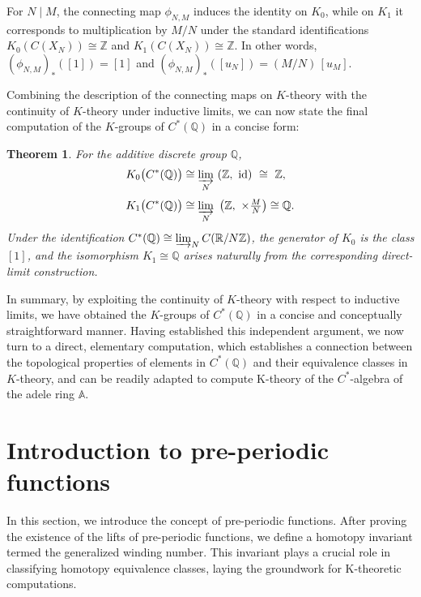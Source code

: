 \documentclass[11pt]{article}
\newtheorem{theorem}{Theorem}[section]  %
\newcommand{\Z}{\mathbb{Z}}
\newcommand{\Q}{\mathbb{Q}}
\newcommand{\R}{\mathbb{R}}
\newcommand{\A}{\mathbb{A}}
\newcommand{\cstar}{C^{*}}
\newcommand{\id}{\mathrm{id}}
\theoremstyle{remark}
\begin{document}
For $N \mid M$, the connecting map $\phi_{N,M}$ induces the identity on $K_0$, 
while on $K_1$ it corresponds to multiplication by $M/N$ under the standard 
identifications $K_0(C(X_N))\cong \Z$ and $K_1(C(X_N))\cong \Z$. 
In other words, $(\phi_{N,M})_*([1])=[1]$ and $(\phi_{N,M})_*([u_N])=(M/N)\,[u_M]$.

Combining the description of the connecting maps on $K$-theory with the continuity of $K$-theory under inductive limits, 
we can now state the final computation of the $K$-groups of $C^*(\mathbb{Q})$ in a concise form:

\begin{theorem}\label{thm:main}
For the additive discrete group $\Q$,
\begin{align*}
K_{0}\big(\cstar(\Q)\big)
 &\cong \varinjlim_{N}\ (\Z,\ \id)\ \cong\ \Z,\\[0.3em]
K_{1}\big(\cstar(\Q)\big)
 &\cong \varinjlim_{N}\ \big(\Z,\ \times\tfrac{M}{N}\big)\cong \Q.
\end{align*}
Under the identification $\cstar(\Q)\cong \varinjlim_{N} C(\R/N\Z)$, the generator of $K_{0}$ is the class $[1]$, 
and the isomorphism $K_{1}\cong \Q$ arises naturally from the corresponding direct-limit construction.

\end{theorem}

In summary, by exploiting the continuity of $K$-theory with respect to inductive limits, 
we have obtained the $K$-groups of $C^*(\mathbb{Q})$ in a concise and conceptually straightforward manner. 
Having established this independent argument, we now turn to a direct, elementary computation, 
which establishes a connection between the topological properties of elements in $C^*(\mathbb{Q})$ and their equivalence classes in $K$-theory, 
and can be readily adapted to compute K-theory of the $C^*$-algebra of the adele ring $\A$.

\section{Introduction to pre-periodic functions}

In this section,  we introduce the concept of pre-periodic functions. After proving the existence of the lifts of pre-periodic functions, we define a homotopy invariant termed the generalized winding number. This invariant plays a crucial role in classifying homotopy equivalence classes, laying the groundwork for K-theoretic computations.
\end{document}
